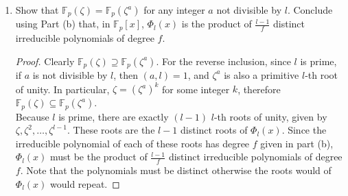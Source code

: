 \documentclass{article}
\begin{document}
\begin{enumerate}[label={(\alph*)}]
    \item Show that $\mathbb{F}_p(\zeta)=\mathbb{F}_p(\zeta^a)$ for any
      integer $a$ not divisible by $l$. Conclude using Part (b) that, in
      $\mathbb{F}_p[x]$, $\Phi_l(x)$ is the product of $\frac{l-1}{f}$
      distinct irreducible polynomials of degree $f$.

      \begin{proof}
        Clearly $\mathbb{F}_p(\zeta) \supseteq\mathbb{F}_p(\zeta^a)$. For
        the reverse inclusion, since $l$ is prime, if $a$ is not divisible
        by $l$, then $(a,l)=1$, and $\zeta^a$ is also a primitive $l$-th
        root of unity. In particular, $\zeta=(\zeta^a)^k$ for some integer
        $k$, therefore $\mathbb{F}_p(\zeta)
        \subseteq\mathbb{F}_p(\zeta^a)$. \\

        Because $l$ is prime, there are exactly $(l-1)$ $l$-th roots of
        unity, given by $\zeta,\zeta^2,\ldots,\zeta^{l-1}$. These roots are
        the $l-1$ distinct roots of $\Phi_l(x)$. Since the irreducible
        polynomial of each of these roots has degree $f$ given in part (b),
        $\Phi_l(x)$ must be the product of $\frac{l-1}{f}$ distinct
        irreducible polynomials of degree $f$. Note that the polynomials
        must be distinct otherwise the roots would of $\Phi_l(x)$ would
        repeat.
      \end{proof}
  \end{enumerate}
\end{document}
